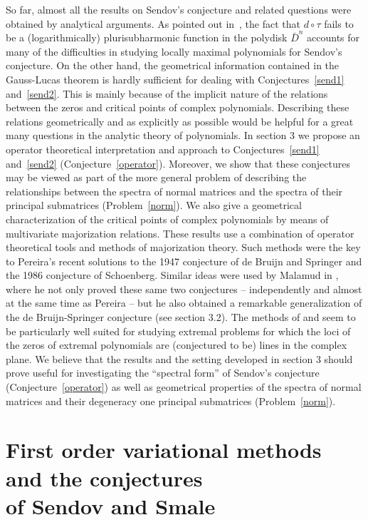 \documentclass[10pt,twoside,a4paper,reqno]{amsart}
\theoremstyle{plain}
\theoremstyle{definition}
\begin{document}
{So far, almost all the results on Sendov's conjecture and related questions 
were obtained by analytical arguments. As pointed out in~\cite{B}, the 
fact that $d\circ \tau$ fails to be a (logarithmically) plurisubharmonic 
function in the polydisk $\bar{D}^n$ accounts for many of the difficulties in 
studying locally maximal polynomials for Sendov's conjecture. On the other 
hand, the geometrical information contained in the 
Gauss-Lucas theorem is hardly sufficient for dealing with 
Conjectures~\ref{send1} and~\ref{send2}. This is mainly because of the 
implicit nature of the relations between the zeros and critical points of 
complex polynomials. 
Describing these relations geometrically and as explicitly as 
possible would be helpful for a great many questions in 
the analytic theory of polynomials. In section 3 we propose an operator 
theoretical interpretation and approach to Conjectures~\ref{send1} 
and~\ref{send2} (Conjecture~\ref{operator}). Moreover, we show that these 
conjectures may be viewed as part of the more general problem of describing 
the relationships between the spectra of normal matrices and the spectra of 
their principal submatrices (Problem~\ref{norm}). We also give a geometrical 
characterization of the 
critical points of complex polynomials by means of multivariate majorization 
relations. These results use a combination of operator theoretical tools and 
methods of majorization theory. Such methods were the key to Pereira's 
recent solutions to the 1947 conjecture of de Bruijn and Springer and the 
1986 conjecture of Schoenberg. Similar ideas were used by Malamud in 
\cite{Ma}, where he not only proved these same two conjectures 
-- independently and almost at the same time as 
Pereira -- but he also obtained a remarkable generalization of the de 
Bruijn-Springer conjecture (see section 3.2). The methods of
\cite{Ma} and \cite{P} seem to be particularly well suited for studying 
extremal problems for which the loci of the zeros of extremal polynomials are 
(conjectured to be) lines in the complex plane. We believe that the results 
and the setting developed in section 3 should prove useful for investigating 
the ``spectral form'' of Sendov's conjecture (Conjecture~\ref{operator}) as
well as geometrical properties of the spectra of normal matrices and their 
degeneracy one principal submatrices (Problem~\ref{norm}). 

\section{First order variational methods and the conjectures \\ of Sendov and 
Smale}

}
\end{document}
